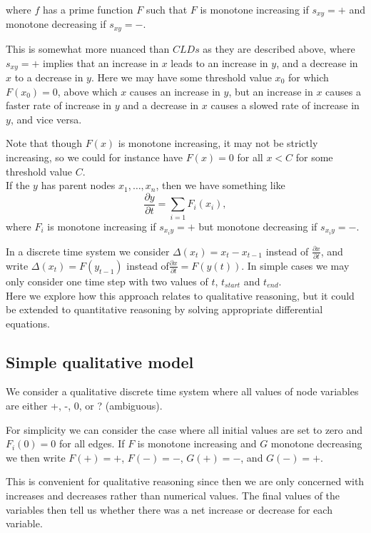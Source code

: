 \documentclass[a4paper,11pt]{article}
\newcommand{\f}[2]{\frac{#1}{#2}}\newcommand{\1}[1]{\frac{1}{#1}}\newcommand{\eps}{\varepsilon}\newcommand{\di}{\displaystyle}
\begin{document}
where $f$ has a prime function $F$ such that $F$ is monotone increasing if
$s_{xy}=+$ and monotone decreasing if $s_{xy}= -$.

This is somewhat more nuanced than $CLDs$ as they are described above, where
$s_{xy}=+$ implies that an increase in $x$ leads to an increase in $y$, and a decrease in $x$ to a
decrease in $y$. Here we may have some threshold value $x_0$ for which $F(x_0) =
0$, above which $x$ causes an increase in $y$, but an increase in $x$ causes a
faster rate of increase in $y$ and a decrease in
$x$ causes a slowed rate of increase in $y$, and vice versa.

Note that though $F(x)$ is monotone increasing, it may not be
strictly increasing, so we could for instance have $F(x) = 0$ for all $x < C$
for some
threshold value $C$.\\

If the $y$ has parent nodes $x_1,\ldots,x_n$, then we have something like
\[\f{\partial y}{\partial t} = \sum_{i=1}F_i(x_i),\]
where $F_i$ is monotone increasing if $s_{x_iy}=+$ but monotone
decreasing if $s_{x_iy}=-$.

In a discrete time system we consider $\Delta(x_t) = x_t - x_{t-1}$ instead of
$\f{\partial x}{\partial t}$, and write $\Delta(x_t) = F(y_{t-1})$ instead
of$\f{\partial x}{\partial t} = F(y(t))$. In simple cases we may only consider one time step
with two values of $t$, $t_{start}$ and $t_{end}$.\\

Here we explore how this approach relates to qualitative reasoning, but it could
be extended to quantitative reasoning by solving appropriate differential equations.
\subsection{Simple qualitative model}
We consider a qualitative discrete time system where all values of node
variables are either +, -, 0, or ? (ambiguous).

For simplicity we can consider the case where all initial values are set to
zero and $F_i(0)=0$ for all edges. If $F$ is monotone increasing and $G$
monotone decreasing we then write
$F(+) = +$, $F(-) = -$, $G(+)=-$, and $G(-)=+$.

This is convenient for qualitative reasoning since then we are only
concerned with increases and decreases rather than numerical values.
The final values of the variables then tell us whether there was a net increase or decrease for each variable.
\end{document}
